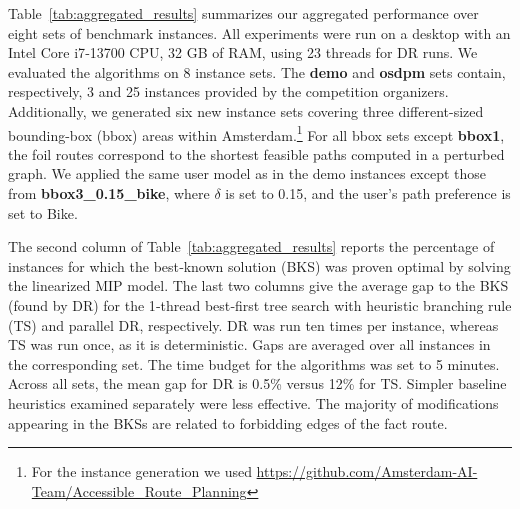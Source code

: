 \documentclass{article}
\begin{document}
Table~\ref{tab:aggregated_results} summarizes our aggregated performance over eight sets of benchmark instances.  All experiments were run on a desktop with an Intel Core i7‑13700 CPU, 32 GB of RAM, using 23 threads for DR runs.
We evaluated the algorithms on 8 instance sets. The \textbf{demo} and \textbf{osdpm} sets contain, respectively, 3 and 25 instances provided by the competition organizers. Additionally, we generated six new instance sets covering three different-sized bounding-box (bbox) areas within Amsterdam.\footnote{For the instance generation we used \url{https://github.com/Amsterdam-AI-Team/Accessible_Route_Planning}} For all bbox sets except \textbf{bbox1}, the foil routes correspond to the shortest feasible paths computed in a perturbed graph. We applied the same user model as in the demo instances except those from \textbf{bbox3\_0.15\_bike}, where $\delta$ is set to 0.15, and the user's path preference is set to Bike.

The second column of Table~\ref{tab:aggregated_results} reports the percentage of instances for which the best‑known solution (BKS) was proven optimal by solving the linearized MIP model. 
The last two columns give the average gap to the BKS (found by DR) for the 1‑thread best‑first tree search with heuristic branching rule (TS) and parallel DR, respectively. DR was run ten times per instance, whereas TS was run once, as it is deterministic. Gaps are averaged over all instances in the corresponding set. The time budget for the algorithms was set to 5 minutes. Across all sets, the mean gap for DR is 0.5\% versus 12\% for TS. Simpler baseline heuristics examined separately were less effective.
The majority of modifications appearing in the BKSs are related to forbidding edges of the fact route.
\end{document}
